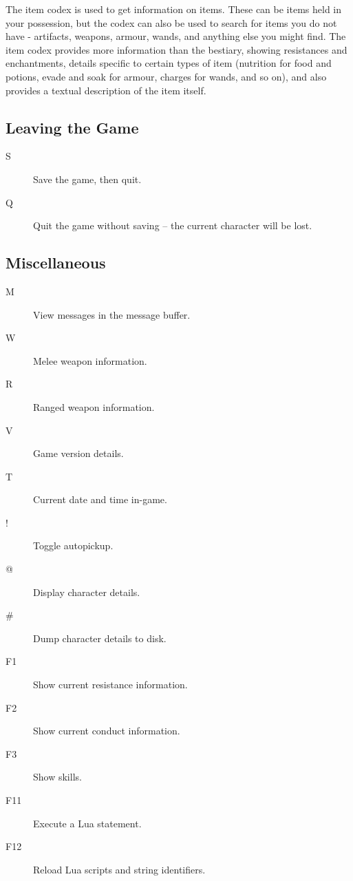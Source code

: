 The item codex is used to get information on items.  These can be items held in your possession, but the codex can also be used to search for items you do not have - artifacts, weapons, armour, wands, and anything else you might find.  The item codex provides more information than the bestiary, showing resistances and enchantments, details specific to certain types of item (nutrition for food and potions, evade and soak for armour, charges for wands, and so on), and also provides a textual description of the item itself.

\subsection{Leaving the Game}

\begin{description}
\item[S] 
Save the game, then quit.
\item[Q] 
Quit the game without saving -- the current character will be lost.
\end{description}

\subsection{Miscellaneous}

\begin{description}
\item[M]
View messages in the message buffer.
\item[W] 
Melee weapon information.
\item[R] 
Ranged weapon information.
\item[V] 
Game version details.
\item[T] 
Current date and time in-game.
\item[!]
Toggle autopickup.
\item[@]
Display character details.
\item[\#] 
Dump character details to disk.
\item[F1] 
Show current resistance information.
\item[F2] 
Show current conduct information.
\item[F3]
Show skills.
\item[F11] 
Execute a Lua statement.
\item[F12] 
Reload Lua scripts and string identifiers.
\end{description}

